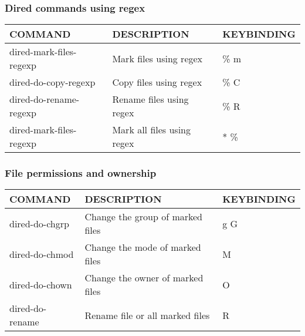 \documentclass[11pt]{article}
\begin{document}
\subsubsection{Dired commands using regex}
\label{sec:orgd088ce3}

\begin{center}
\begin{tabular}{lll}
COMMAND & DESCRIPTION & KEYBINDING\\[0pt]
\hline
dired-mark-files-regexp & Mark files using regex & \% m\\[0pt]
dired-do-copy-regexp & Copy files using regex & \% C\\[0pt]
dired-do-rename-regexp & Rename files using regex & \% R\\[0pt]
dired-mark-files-regexp & Mark all files using regex & * \%\\[0pt]
\end{tabular}
\end{center}

\subsubsection{File permissions and ownership}
\label{sec:orgf3aa48f}

\begin{center}
\begin{tabular}{lll}
COMMAND & DESCRIPTION & KEYBINDING\\[0pt]
\hline
dired-do-chgrp & Change the group of marked files & g G\\[0pt]
dired-do-chmod & Change the mode of marked files & M\\[0pt]
dired-do-chown & Change the owner of marked files & O\\[0pt]
dired-do-rename & Rename file or all marked files & R\\[0pt]
\end{tabular}
\end{center}
\end{document}
